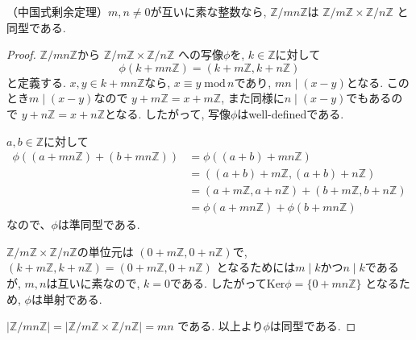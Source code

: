 \begin{tcolorbox}
	\begin{thm*}
		（中国式剰余定理）$m,n \neq 0$が互いに素な整数なら,
		$\mathbb{Z}/mn\mathbb{Z}$は
		$\mathbb{Z}/m\mathbb{Z}\times \mathbb{Z}/n\mathbb{Z}$
		と同型である.
	\end{thm*}
\end{tcolorbox}

\begin{proof}
	$\mathbb{Z}/mn\mathbb{Z}$から
	$\mathbb{Z}/m\mathbb{Z}\times \mathbb{Z}/n\mathbb{Z}$
	への写像$\phi$を, $k\in \mathbb{Z}$に対して
	\[ \phi(k+mn\mathbb{Z})=(k+m\mathbb{Z},k+n\mathbb{Z})\]
	と定義する.
	$x,y\in k+mn\mathbb{Z}$なら, $x\equiv y \; \mathrm{mod}\,n$であり,
	$mn \mid (x-y)$となる. このとき$m \mid (x-y)$なので
	$y+m\mathbb{Z}=x+m\mathbb{Z}$, また同様に$n\mid (x-y)$でもあるので
	$y+n\mathbb{Z}=x+n\mathbb{Z}$となる.
	したがって, 写像$\phi$はwell-definedである.

	$a,b\in \mathbb{Z}$に対して
	\begin{align*}
		\phi((a+mn\mathbb{Z})+(b+mn\mathbb{Z}))
		&=\phi((a+b)+mn\mathbb{Z})\\
		&=((a+b)+m\mathbb{Z},(a+b)+n\mathbb{Z})\\
		&=(a+m\mathbb{Z},a+n\mathbb{Z})+(b+m\mathbb{Z},b+n\mathbb{Z})\\
		&=\phi(a+mn\mathbb{Z})+\phi(b+mn\mathbb{Z})
	\end{align*}
	なので、$\phi$は準同型である.

	$\mathbb{Z}/m\mathbb{Z}\times \mathbb{Z}/n\mathbb{Z}$の単位元は
	$(0+m\mathbb{Z}, 0+n\mathbb{Z})$で,
	$(k+m\mathbb{Z},k+n\mathbb{Z})=(0+m\mathbb{Z},0+n\mathbb{Z})$
	となるためには$m\mid k$かつ$n\mid k$であるが,
	$m,n$は互いに素なので, $k=0$である. 
	したがって$\mathrm{Ker}\phi = \{0+mn\mathbb{Z}\}$
	となるため, $\phi$は単射である.

	$|\mathbb{Z}/mn\mathbb{Z}|
	 =|\mathbb{Z}/m\mathbb{Z}\times \mathbb{Z}/n\mathbb{Z}|=mn$
	である. 以上より$\phi$は同型である.
\end{proof}
